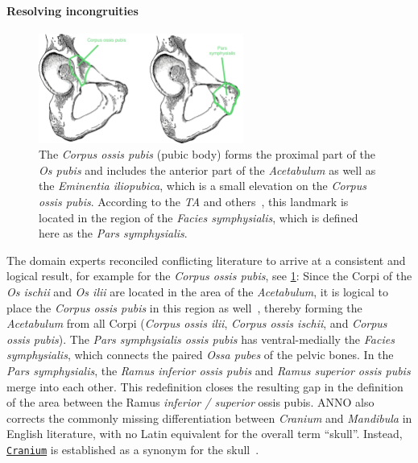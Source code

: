 \documentclass[sw]{iosart2x}
\newcommand{\anno}[1]{\href{https://annosaxfdm.de/ontology/#1}{\texttt{#1}}}
\newcommand{\latin}[1]{\emph{#1}}
\begin{document}

\paragraph{Resolving incongruities}
\begin{figure}[h]
\centering
\includegraphics[width=0.6\textwidth]{img/corpus_ossis_pubis.png}
\caption{The \latin{Corpus ossis pubis} (pubic body) forms the proximal part of the \latin{Os pubis} and includes the anterior part of the \latin{Acetabulum} as well as the \latin{Eminentia iliopubica}, which is a small elevation on the \latin{Corpus ossis pubis}.
According to the \emph{TA} and others~\citep{ta2,schemamann,anatomylexicon2007,drake2019gray,anatomylexicon,prometheus2,anatomie}, this landmark is located in the region of the \latin{Facies symphysialis}, which is defined here as the \latin{Pars symphysialis}.
}\label{fig:corpusossispubis}
\end{figure}

The domain experts reconciled conflicting literature to arrive at a consistent and logical result, for example for the \latin{Corpus ossis pubis}, see \cref{fig:corpusossispubis}:
Since the Corpi of the \latin{Os ischii} and \latin{Os ilii} are located in the area of the \latin{Acetabulum},
it is logical to place the \latin{Corpus ossis pubis} in this region as well~\citep{graysanatomy,waldeyer,allgemeineanatomie,datacollection2,romanianmandible}, thereby forming the \latin{Acetabulum} from all Corpi (\latin{Corpus ossis ilii}, \latin{Corpus ossis ischii}, and \latin{Corpus ossis pubis}).
The \latin{Pars symphysialis ossis pubis} has ventral-medially the \latin{Facies symphysialis}, which connects the paired \latin{Ossa pubes} of the pelvic bones.
In the \latin{Pars symphysialis}, the \latin{Ramus inferior ossis pubis} and \latin{Ramus superior ossis pubis} merge into each other.
This redefinition closes the resulting gap in the definition of the area between the Ramus \emph{inferior / superior} ossis pubis.
%
ANNO also corrects the commonly missing differentiation between \emph{Cranium} and \emph{Mandibula} in English literature, with no Latin equivalent for the overall term \enquote{skull}.
Instead, \anno{Cranium} is established as a synonym for the skull~\citep{allgemeineanatomieen,prometheus2}.
\end{document}
